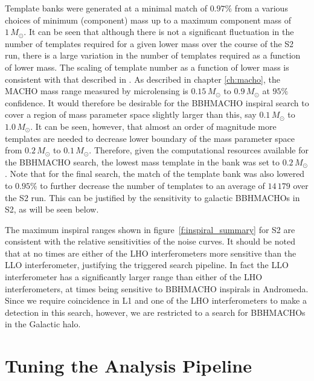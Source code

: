 Template banks were generated at a minimal match of $0.97\%$ from a various
choices of minimum (component) mass up to a maximum component mass of
$1\,M_\odot$. It can be seen that although there is not a significant
fluctuation in the number of templates required for a given lower mass over
the course of the S2 run, there is a large variation in the number of
templates required as a function of lower mass. The scaling of template number
as a function of lower mass is consistent with that described in
\cite{Owen:1998dk}. As described in chapter \ref{ch:macho}, the MACHO mass
range measured by microlensing is $0.15\,M_\odot$ to $0.9\,M_\odot$ at $95\%$
confidence. It would therefore be desirable for the BBHMACHO inspiral search
to cover a region of mass parameter space slightly larger than this, say
$0.1\,M_\odot$ to $1.0\,M_\odot$.  It can be seen, however, that almost an
order of magnitude more templates are needed to decrease lower boundary of
the mass parameter space from $0.2\,M_\odot$ to $0.1\,M_\odot$.  Therefore,
given the computational resources available for the BBHMACHO search, the
lowest mass template in the bank was set to $0.2\,M_\odot$. Note that for the
final search, the match of the template bank was also lowered to $0.95\%$ to
further decrease the number of templates to an average of $14\,179$ over the
S2 run. This can be justified by the sensitivity to galactic BBHMACHOs in S2,
as will be seen below.

The maximum inspiral ranges shown in figure~\ref{f:inspiral_summary} for S2
are consistent with the relative sensitivities of the noise curves. It should
be noted that at no times are either of the LHO interferometers more sensitive
than the LLO interferometer, justifying the triggered search pipeline. In fact
the LLO interferometer has a significantly larger range than either of the LHO
interferometers, at times being sensitive to BBHMACHO inspirals in Andromeda.
Since we require coincidence in L1 and one of the LHO interferometers to make
a detection in this search, however, we are restricted to a search for
BBHMACHOs in the Galactic halo.  

\section{Tuning the Analysis Pipeline}
\label{s:s2tuning}

